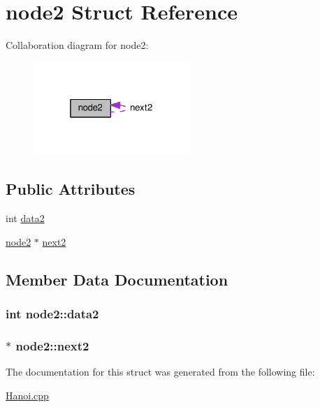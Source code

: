 \hypertarget{structnode2}{}\section{node2 Struct Reference}
\label{structnode2}


Collaboration diagram for node2\+:
\nopagebreak
\begin{figure}[H]
\begin{center}
\leavevmode
\includegraphics[width=169pt]{structnode2__coll__graph}
\end{center}
\end{figure}
\subsection*{Public Attributes}
\begin{DoxyCompactItemize}
\item 
int \hyperlink{structnode2_ac38e75c0b249b933c51d09adc1a666a0}{data2}
\item 
\hyperlink{structnode2}{node2} $\ast$ \hyperlink{structnode2_af74ee79191b380680f1546772bdd5b75}{next2}
\end{DoxyCompactItemize}


\subsection{Member Data Documentation}
\subsubsection[{\texorpdfstring{data2}{data2}}]{\setlength{\rightskip}{0pt plus 5cm}int node2\+::data2}\hypertarget{structnode2_ac38e75c0b249b933c51d09adc1a666a0}{}\label{structnode2_ac38e75c0b249b933c51d09adc1a666a0}
\subsubsection[{\texorpdfstring{next2}{next2}}]{$\ast$ node2\+::next2}\hypertarget{structnode2_af74ee79191b380680f1546772bdd5b75}{}\label{structnode2_af74ee79191b380680f1546772bdd5b75}


The documentation for this struct was generated from the following file\+:\begin{DoxyCompactItemize}
\item 
\hyperlink{Hanoi_8cpp}{Hanoi.\+cpp}\end{DoxyCompactItemize}
